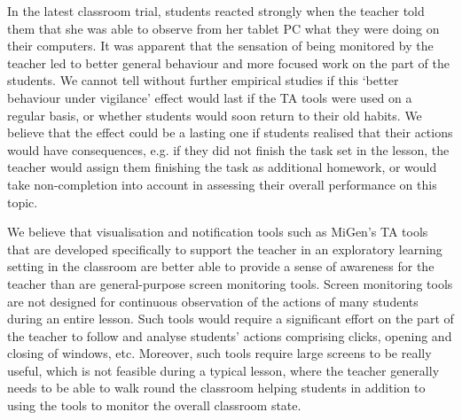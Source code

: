 In the latest classroom trial, students reacted strongly when the teacher 
told them that she was able to observe from her tablet PC what they were 
doing on their computers. %
It was apparent that the sensation of being monitored by the teacher 
led to better general behaviour and more focused work on the part of 
the students. 
We cannot tell without further empirical studies if this 
`better behaviour under vigilance' effect 
would last if the TA tools were used on a regular basis, or whether
students would soon return to their old habits. 
We believe that the effect could be a lasting one if students realised that their
actions would have consequences, e.g. if they did not finish
the task set in the lesson, the teacher would assign them finishing the task
as additional homework, or would take non-completion into account in assessing
their overall performance on this topic. 

We believe that visualisation and notification tools such as MiGen's TA tools 
that are developed specifically to support the teacher in an exploratory learning setting 
in the classroom are better able to provide a sense of awareness for the teacher 
than are general-purpose screen monitoring tools.
Screen monitoring tools are not designed for continuous observation 
of the actions of many students during an entire lesson. 
Such tools would require a significant effort
on the part of the teacher to follow and analyse students' actions
comprising clicks, opening and closing of windows, etc. Moreover, such
tools require large screens to be really useful, which is not feasible
during a typical lesson, where the teacher generally needs to be able
to walk round the classroom helping students in addition to using the
tools to monitor the overall classroom state. 

